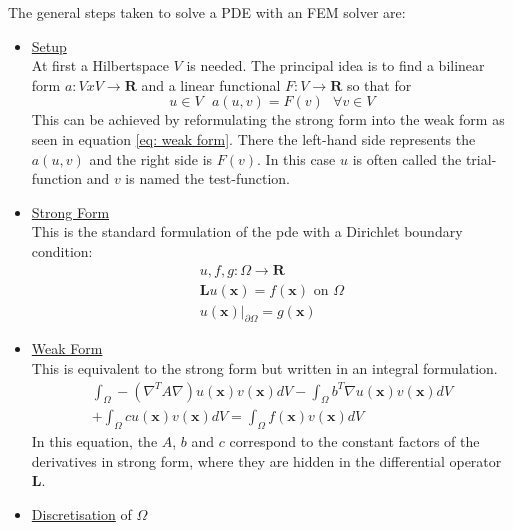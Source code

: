 \documentclass[./\jobname.tex,hidelinks]{subfiles}
\begin{document}
The general steps taken to solve a PDE with an FEM solver are: 
\begin{itemize}
	\item \underline{Setup} \\
		  At first a Hilbertspace $V$ is needed. The principal idea is to find a bilinear form $a: V x V \rightarrow \mathbf{R}$ and a linear functional $F: V \rightarrow \mathbf{R}$ so that for 
		  \begin{equation}
			  u \in V \text{   } a(u,v) = F(v) \text{   } \forall v \in V
		  \end{equation}
		  This can be achieved by reformulating the strong form into the weak form as seen in equation \ref{eq: weak form}. There the left-hand side represents the $a(u,v)$ and the right side is $F(v)$. In this case $u$ is often called the trial-function and $v$ is named the test-function. 
	\item \underline{Strong Form} \\
		  This is the standard formulation of the \gls{pde} with a Dirichlet boundary condition: \\
		  \begin{equation}
			  \begin{split}
			  	u, f, g: \Omega \rightarrow \mathbf{R} \\
				\mathbf{L} u(\mathbf{x}) = f(\mathbf{x}) \text{ on $\Omega$} \\
				u(\mathbf{x})|_{\partial \Omega} = g(\mathbf{x})
			  \end{split}
		  \end{equation}
	\item \underline{Weak Form} \\
		  This is equivalent to the strong form but written in an integral formulation. \\
		  \begin{equation}
		  \label{eq: weak form}
			  \begin{split}
			      \int_{\Omega} - (\nabla^T A \nabla) u(\mathbf{x}) v(\mathbf{x}) dV - \int_{\Omega} b^T \nabla u(\mathbf{x}) v(\mathbf{x}) dV \\
			      + \int_{\Omega} c u(\mathbf{x}) v(\mathbf{x}) dV = \int_{\Omega} f(\mathbf{x}) v(\mathbf{x}) dV
			  \end{split}
		  \end{equation}
		  In this equation, the $A$, $b$ and $c$ correspond to the constant factors of the derivatives in strong form, where they are hidden in the differential operator $\mathbf{L}$.
	\item \underline{Discretisation} of $\Omega$ \\

\end{itemize}
\end{document}
